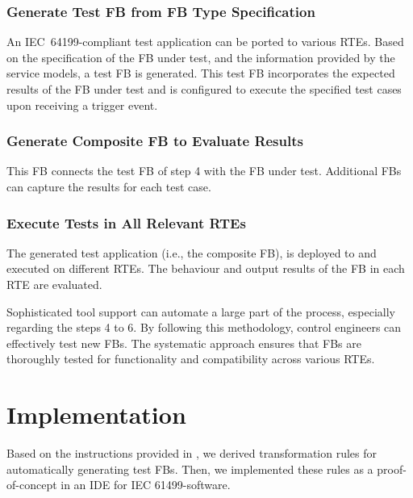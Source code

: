 \begin{bibunit}
  
\subsubsection{Generate Test FB from FB Type Specification}
    An IEC~64199-compliant test application can be ported to various RTEs.
   Based on the specification of the FB under test, and the information provided by the service models, a test FB is generated. This test FB incorporates the expected results of the FB under test and is configured to execute the specified test cases upon receiving a trigger event.
   
\subsubsection{Generate Composite FB to Evaluate Results}
  This FB connects the test FB of step 4 with the FB under test. 
   Additional FBs can capture the results for each test case.
   
\subsubsection{Execute Tests in All Relevant RTEs}
   The generated test application (i.e., the composite FB), is deployed to and executed on different RTEs. The behaviour and output results of the FB in each RTE are evaluated.

Sophisticated tool support can automate a large part of the process, especially regarding the steps 4 to 6. By following this methodology, control engineers can effectively test new FBs. The systematic approach ensures that FBs are thoroughly tested for functionality and compatibility across various RTEs.

\section{Implementation}
Based on the instructions provided in \cite{Testing_Midhun}, we derived transformation rules for automatically generating test FBs. Then, we implemented these rules as a proof-of-concept in an IDE for IEC 61499-software.

% 

\end{bibunit}

